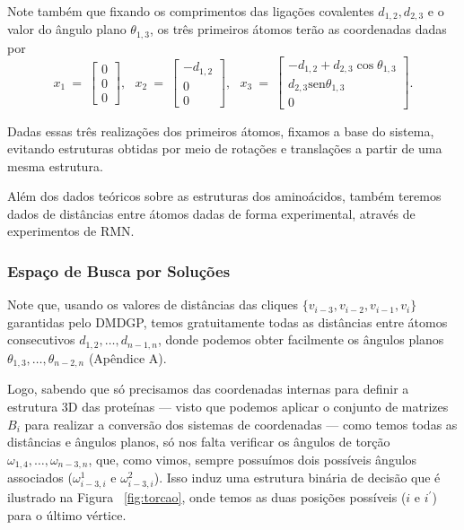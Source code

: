 \documentclass[a4paper,12pt]{article}
\begin{document}
 	Note também que fixando os comprimentos das ligações covalentes $d_{1,2},d_{2,3}$ e o valor do ângulo plano $\theta_{1,3}$, os três primeiros átomos terão as coordenadas dadas por
 	$$
 	x_1\:=\:
 	\begin{bmatrix}
 	0\\ 
 	0\\  
 	0
 	\end{bmatrix},\:\:\:
 	x_2\:=\:
 	\begin{bmatrix}
 	-d_{1,2}\\ 
 	0\\  
 	0
 	\end{bmatrix},\:\:\:
 	x_3\:=\:
 	\begin{bmatrix}
 	-d_{1,2}+d_{2,3}\cos\theta_{1,3}\\ 
 	d_{2,3}\mbox{sen}\theta_{1,3}\\  
 	0
 	\end{bmatrix}.
 	$$
 	
 	Dadas essas três realizações dos primeiros átomos, fixamos a base do sistema, evitando estruturas obtidas por meio de rotações e translações a partir de uma mesma estrutura.	
 	
 	Além dos dados teóricos sobre as estruturas dos aminoácidos, também teremos dados de distâncias entre átomos dadas de forma experimental, através de experimentos de RMN.
 	
 	\subsubsection{Espaço de Busca por Soluções}
 	Note que, usando os valores de distâncias das cliques $\{ v_{i-3}, v_{i-2} , v_{i-1}, v_i \}$ garantidas pelo DMDGP, temos gratuitamente todas as distâncias entre átomos consecutivos $d_{1,2}, \dots, d_{n-1, n}$, donde podemos obter facilmente os ângulos planos $\theta_{1,3}, \dots, \theta_{n-2, n}$ (Apêndice A).
 	
 	Logo, sabendo que só precisamos das coordenadas internas para definir a estrutura 3D das proteínas --- visto que podemos aplicar o conjunto de matrizes $B_i$ para realizar a conversão dos sistemas de coordenadas --- como temos todas as distâncias e ângulos planos, só nos falta verificar os ângulos de torção $\omega_{1,4}, \dots, \omega_{n-3, n}$, que, como vimos, sempre possuímos dois possíveis ângulos associados ($\omega_{i-3, i}^1$ e $\omega_{i-3,i}^2$). Isso induz uma estrutura binária de decisão que é ilustrado na Figura ~\ref{fig:torcao}, onde temos as duas posições possíveis ($i$ e $i^\prime$) para o último vértice.
 	
\end{document}
